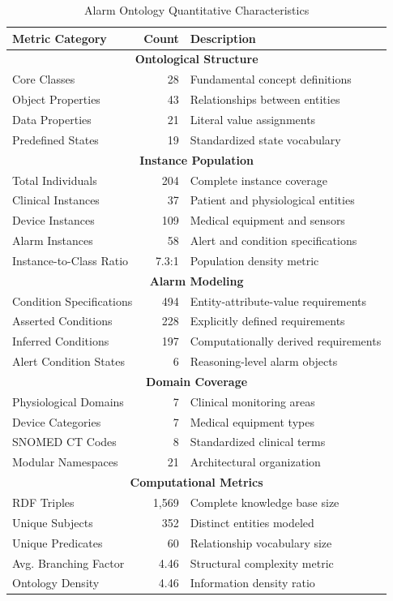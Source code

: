 \begin{table}[htbp]
\centering
\caption{Alarm Ontology Quantitative Characteristics}
\label{tab:ontology_metrics}
\begin{tabular}{|l|r|l|}
\hline
\textbf{Metric Category} & \textbf{Count} & \textbf{Description} \\
\hline
\multicolumn{3}{|c|}{\textbf{Ontological Structure}} \\
\hline
Core Classes & 28 & Fundamental concept definitions \\
Object Properties & 43 & Relationships between entities \\
Data Properties & 21 & Literal value assignments \\
Predefined States & 19 & Standardized state vocabulary \\
\hline
\multicolumn{3}{|c|}{\textbf{Instance Population}} \\
\hline
Total Individuals & 204 & Complete instance coverage \\
Clinical Instances & 37 & Patient and physiological entities \\
Device Instances & 109 & Medical equipment and sensors \\
Alarm Instances & 58 & Alert and condition specifications \\
Instance-to-Class Ratio & 7.3:1 & Population density metric \\
\hline
\multicolumn{3}{|c|}{\textbf{Alarm Modeling}} \\
\hline
Condition Specifications & 494 & Entity-attribute-value requirements \\
Asserted Conditions & 228 & Explicitly defined requirements \\
Inferred Conditions & 197 & Computationally derived requirements \\
Alert Condition States & 6 & Reasoning-level alarm objects \\
\hline
\multicolumn{3}{|c|}{\textbf{Domain Coverage}} \\
\hline
Physiological Domains & 7 & Clinical monitoring areas \\
Device Categories & 7 & Medical equipment types \\
SNOMED CT Codes & 8 & Standardized clinical terms \\
Modular Namespaces & 21 & Architectural organization \\
\hline
\multicolumn{3}{|c|}{\textbf{Computational Metrics}} \\
\hline
RDF Triples & 1,569 & Complete knowledge base size \\
Unique Subjects & 352 & Distinct entities modeled \\
Unique Predicates & 60 & Relationship vocabulary size \\
Avg. Branching Factor & 4.46 & Structural complexity metric \\
Ontology Density & 4.46 & Information density ratio \\
\hline
\end{tabular}
\end{table}